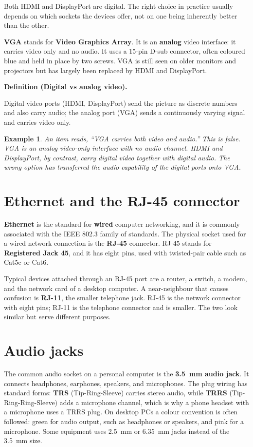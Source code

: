 \documentclass[11pt]{article}
\newtheorem{example}{Example}[section]
\newenvironment{definitionbox}[1]{%
  \par\noindent\textbf{Definition (#1).}\ \itshape
}{\par\vspace{0.3em}}
\begin{document}
Both HDMI and DisplayPort are digital. The right choice in practice usually
depends on which sockets the devices offer, not on one being inherently
better than the other.

\textbf{VGA} stands for \textbf{Video Graphics Array}. It is an
\textbf{analog} video interface: it carries video only and no audio. It uses
a 15-pin D-sub connector, often coloured blue and held in place by two
screws. VGA is still seen on older monitors and projectors but has largely
been replaced by HDMI and DisplayPort.

\begin{definitionbox}{Digital vs analog video}
Digital video ports (HDMI, DisplayPort) send the picture as discrete numbers
and also carry audio; the analog port (VGA) sends a continuously varying
signal and carries video only.
\end{definitionbox}

\begin{example}
An item reads, ``VGA carries both video and audio.'' This is false. VGA is an
analog video-only interface with no audio channel. HDMI and DisplayPort, by
contrast, carry digital video together with digital audio. The wrong option
has transferred the audio capability of the digital ports onto VGA.
\end{example}

\section{Ethernet and the RJ-45 connector}
\textbf{Ethernet} is the standard for \textbf{wired} computer networking, and
it is commonly associated with the IEEE 802.3 family of standards. The
physical socket used for a wired network connection is the \textbf{RJ-45}
connector. RJ-45 stands for \textbf{Registered Jack 45}, and it has eight
pins, used with twisted-pair cable such as Cat5e or Cat6.

Typical devices attached through an RJ-45 port are a router, a switch, a
modem, and the network card of a desktop computer. A near-neighbour that
causes confusion is \textbf{RJ-11}, the smaller telephone jack. RJ-45 is the
network connector with eight pins; RJ-11 is the telephone connector and is
smaller. The two look similar but serve different purposes.

\section{Audio jacks}
The common audio socket on a personal computer is the \textbf{3.5~mm audio
jack}. It connects headphones, earphones, speakers, and microphones. The plug
wiring has standard forms: \textbf{TRS} (Tip-Ring-Sleeve) carries stereo
audio, while \textbf{TRRS} (Tip-Ring-Ring-Sleeve) adds a microphone channel,
which is why a phone headset with a microphone uses a TRRS plug. On desktop
PCs a colour convention is often followed: green for audio output, such as
headphones or speakers, and pink for a microphone. Some equipment uses
2.5~mm or 6.35~mm jacks instead of the 3.5~mm size.
\end{document}
